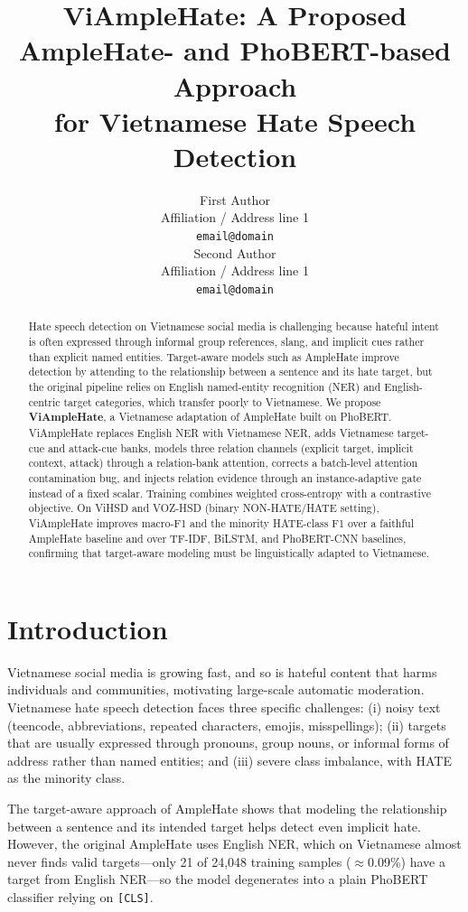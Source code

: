 \documentclass[11pt]{article}
\title{ViAmpleHate: A Proposed AmpleHate- and PhoBERT-based Approach\\ for Vietnamese Hate Speech Detection}
\author{First Author \\
  Affiliation / Address line 1 \\
  \texttt{email@domain} \\\And
  Second Author \\
  Affiliation / Address line 1 \\
  \texttt{email@domain} \\}
\begin{document}
\maketitle

\begin{abstract}
Hate speech detection on Vietnamese social media is challenging because hateful intent is often expressed through informal group references, slang, and implicit cues rather than explicit named entities. Target-aware models such as AmpleHate improve detection by attending to the relationship between a sentence and its hate target, but the original pipeline relies on English named-entity recognition (NER) and English-centric target categories, which transfer poorly to Vietnamese. We propose \textbf{ViAmpleHate}, a Vietnamese adaptation of AmpleHate built on PhoBERT. ViAmpleHate replaces English NER with Vietnamese NER, adds Vietnamese target-cue and attack-cue banks, models three relation channels (explicit target, implicit context, attack) through a relation-bank attention, corrects a batch-level attention contamination bug, and injects relation evidence through an instance-adaptive gate instead of a fixed scalar. Training combines weighted cross-entropy with a contrastive objective. On ViHSD and VOZ-HSD (binary NON-HATE/HATE setting), ViAmpleHate improves macro-F1 and the minority HATE-class F1 over a faithful AmpleHate baseline and over TF-IDF, BiLSTM, and PhoBERT-CNN baselines, confirming that target-aware modeling must be linguistically adapted to Vietnamese.
\end{abstract}

\section{Introduction}

Vietnamese social media is growing fast, and so is hateful content that harms individuals and communities, motivating large-scale automatic moderation. Vietnamese hate speech detection faces three specific challenges: (i) noisy text (teencode, abbreviations, repeated characters, emojis, misspellings); (ii) targets that are usually expressed through pronouns, group nouns, or informal forms of address rather than named entities; and (iii) severe class imbalance, with HATE as the minority class.

The target-aware approach of AmpleHate \citep{amplehate} shows that modeling the relationship between a sentence and its intended target helps detect even implicit hate. However, the original AmpleHate uses English NER, which on Vietnamese almost never finds valid targets---only 21 of 24{,}048 training samples ($\approx$0.09\%) have a target from English NER---so the model degenerates into a plain PhoBERT classifier relying on \texttt{[CLS]}.
\end{document}
